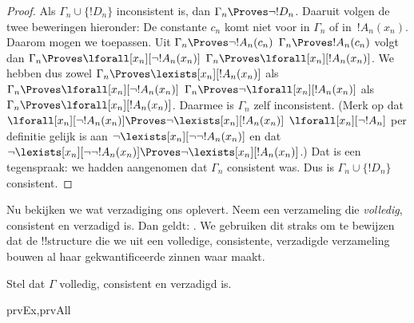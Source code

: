 \documentclass[../../../include/open-logic-section]{subfiles}
\begin{document}
\begin{proof}
Als $\Gamma_n \cup \{!D_n\}$ inconsistent is, dan $\Gamma_n
\Proves \lnot !D_n$. Daaruit volgen de twee beweringen hieronder:
De constante $c_n$ komt niet voor in
$\Gamma_n$ of in~$!A_n(x_n)$. Daarom mogen we
toepassen. Uit 
{$\Gamma_n \Proves \lnot !A_n(c_n)$}
{$\Gamma_n \Proves !A_n(c_n)$}
volgt dan
{$\Gamma_n \Proves \lforall[x_n][\lnot !A_n(x_n)]$}
{$\Gamma_n \Proves \lforall[x_n][!A_n(x_n)]$}.
We hebben dus zowel
{$\Gamma_n \Proves \lexists[x_n][!A_n(x_n)]$ als
$\Gamma_n \Proves \lforall[x_n][\lnot !A_n(x_n)]$}
{$\Gamma_n \Proves \lnot\lforall[x_n][!A_n(x_n)]$ als
$\Gamma_n \Proves \lforall[x_n][!A_n(x_n)]$}.
Daarmee is $\Gamma_n$ zelf inconsistent.
{(Merk op dat
{$\lforall[x_n][\lnot !A_n(x_n)] \Proves
  \lnot\lexists[x_n][!A_n(x_n)]$}
{$\lforall[x_n][\lnot !A_n]$ per definitie gelijk is aan
  $\lnot\lexists[x_n][\lnot\lnot !A_n(x_n)]$ en dat
  $\lnot\lexists[x_n][\lnot\lnot !A_n(x_n)] \Proves
  \lnot\lexists[x_n][!A_n(x_n)]$}.)}{}
Dat is een tegenspraak: we hadden aangenomen dat $\Gamma_n$ consistent
was. Dus is $\Gamma_n \cup \{ !D_n\}$ consistent.
\end{proof}

\begin{explain}
Nu bekijken we wat verzadiging ons oplevert. Neem een verzameling die
\emph{volledig}, consistent en verzadigd is. Dan geldt:
. We
gebruiken dit straks om te bewijzen dat de !!{structure} die we uit een
volledige, consistente, verzadigde verzameling bouwen al haar
gekwantificeerde zinnen waar maakt.
\end{explain}

\begin{prop}
Stel dat $\Gamma$ volledig, consistent en verzadigd is.
\begin{tagenumerate}{prvEx,prvAll}
\end{tagenumerate}
\end{prop}
\end{document}
